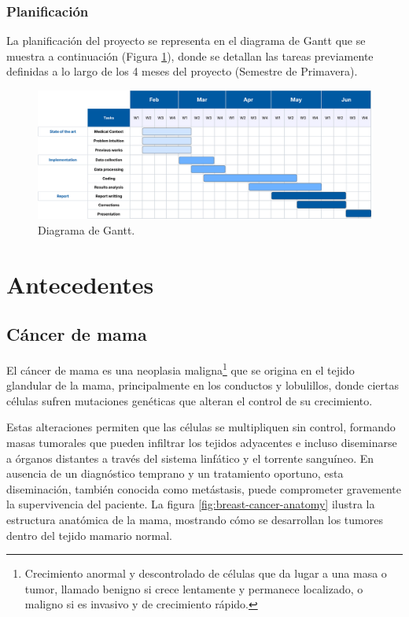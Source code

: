 \documentclass[a4paper,10pt]{book}
\begin{document}
\subsection{Planificación}

La planificación del proyecto se representa en el diagrama de Gantt que se muestra a continuación (Figura \ref{fig:roadmap}), donde se detallan las tareas previamente definidas a lo largo de los 4 meses del proyecto (Semestre de Primavera).

\begin{figure}[h!]
\centering
\includegraphics[width=1\linewidth]{reports//assets/RoadmapV3.png}
\caption[Diagrama de Gantt de planificación]{Diagrama de Gantt.}
\label{fig:roadmap}
\end{figure}




\chapter{Antecedentes}

\section{Cáncer de mama}

El cáncer de mama es una neoplasia maligna\footnote{Crecimiento anormal y descontrolado de células que da lugar a una masa o tumor, llamado benigno si crece lentamente y permanece localizado, o maligno si es invasivo y de crecimiento rápido.} que se origina en el tejido glandular de la mama, principalmente en los conductos y lobulillos, donde ciertas células sufren mutaciones genéticas que alteran el control de su crecimiento.

Estas alteraciones permiten que las células se multipliquen sin control, formando masas tumorales que pueden infiltrar los tejidos adyacentes e incluso diseminarse a órganos distantes a través del sistema linfático y el torrente sanguíneo. En ausencia de un diagnóstico temprano y un tratamiento oportuno, esta diseminación, también conocida como metástasis, puede comprometer gravemente la supervivencia del paciente. La figura \ref{fig:breast-cancer-anatomy} ilustra la estructura anatómica de la mama, mostrando cómo se desarrollan los tumores dentro del tejido mamario normal.
\end{document}

